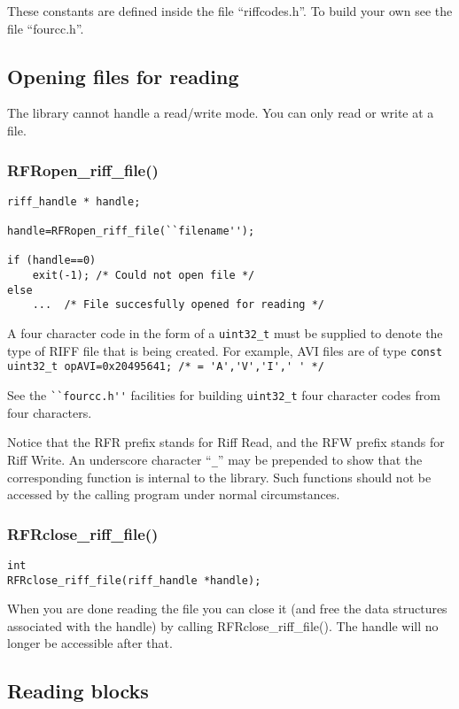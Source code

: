 \documentclass[12pt, a4paper]{article}
\begin{document}
These constants are defined inside the file ``riffcodes.h''. To
build your own see the file ``fourcc.h''.

\subsection{Opening files for reading}
 The library cannot handle a read/write mode. You can only read or write at
a file.

\subsubsection{RFRopen\_riff\_file()}
\begin{verbatim}
riff_handle * handle;

handle=RFRopen_riff_file(``filename'');

if (handle==0) 
	exit(-1); /* Could not open file */
else  
	...  /* File succesfully opened for reading */
\end{verbatim}

A four character code in the form of a \verb+uint32_t+ must 
be supplied to denote the type of RIFF file that is 
being created. For example, AVI files are of type
\verb+const uint32_t opAVI=0x20495641; /* = 'A','V','I',' ' */+

See the \verb+``fourcc.h''+ facilities for building \verb+uint32_t+
four character codes from four characters.

 Notice that the RFR prefix stands for Riff Read, and the RFW prefix stands for
Riff Write. An underscore character ``\verb+_+'' may be prepended to show that 
the corresponding function is internal to the library. Such functions should not
be accessed by the calling program under normal circumstances.

\subsubsection{RFRclose\_riff\_file()}
\begin{verbatim}
int
RFRclose_riff_file(riff_handle *handle);
\end{verbatim}

When you are done reading the file you can close it (and free the data structures
associated with the handle) by calling RFRclose\_riff\_file(). The handle will
no longer be accessible after that. 


\subsection{Reading blocks}
\end{document}
